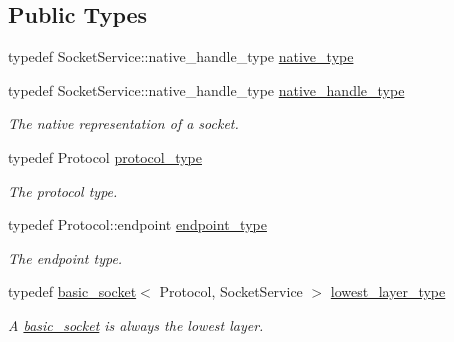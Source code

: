 \subsection*{Public Types}
\begin{DoxyCompactItemize}
\item 
typedef Socket\+Service\+::native\+\_\+handle\+\_\+type \hyperlink{classasio_1_1basic__socket_a51a45a62e006c34758eff7a409f57eda}{native\+\_\+type}
\item 
typedef Socket\+Service\+::native\+\_\+handle\+\_\+type \hyperlink{classasio_1_1basic__socket_a3481ac06d51afa0cb23f09cd39ac64eb}{native\+\_\+handle\+\_\+type}
\begin{DoxyCompactList}\small\item\em The native representation of a socket. \end{DoxyCompactList}\item 
typedef Protocol \hyperlink{classasio_1_1basic__socket_a5890addc84762c67f2b3f1723428721d}{protocol\+\_\+type}
\begin{DoxyCompactList}\small\item\em The protocol type. \end{DoxyCompactList}\item 
typedef Protocol\+::endpoint \hyperlink{classasio_1_1basic__socket_a6b2ba27d020bb24356c691f19f8d2829}{endpoint\+\_\+type}
\begin{DoxyCompactList}\small\item\em The endpoint type. \end{DoxyCompactList}\item 
typedef \hyperlink{classasio_1_1basic__socket}{basic\+\_\+socket}$<$ Protocol, Socket\+Service $>$ \hyperlink{classasio_1_1basic__socket_a7e749e9f9d470ab881564bd549473d2f}{lowest\+\_\+layer\+\_\+type}
\begin{DoxyCompactList}\small\item\em A \hyperlink{classasio_1_1basic__socket}{basic\+\_\+socket} is always the lowest layer. \end{DoxyCompactList}\end{DoxyCompactItemize}
